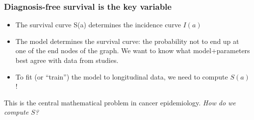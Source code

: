 \documentclass{beamer}
\begin{document}
\begin{frame}
    \frametitle{Diagnosis-free survival is the key variable}

    \begin{itemize}
        \item The survival curve S(a) determines the incidence curve $I(a)$ 
        \item The model determines the survival curve: the probability not to
        end up at one of the end nodes of the graph. We want to know what model+parameters best agree with
        data from studies.
        \item To fit (or ``train'') the model to longitudinal data, we need to compute $S(a)$!
    \end{itemize}

    \;

    This is the central mathematical problem in cancer epidemiology. \emph{How do we compute $S$?}
\end{frame}
\end{document}
